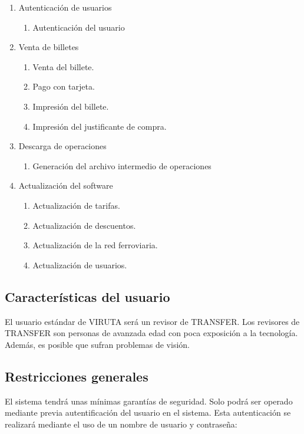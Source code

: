 \begin{enumerate}
\item Autenticación de usuarios
	\begin{enumerate}
	\item Autenticación del usuario
	\end{enumerate}
\item Venta de billetes
	\begin{enumerate}
	\item Venta del billete.
	\item Pago con tarjeta.
	\item Impresión del billete.
	\item Impresión del justificante de compra.
	\end{enumerate}
\item Descarga de operaciones
	\begin{enumerate}
	\item Generación del archivo intermedio de operaciones
	\end{enumerate}
\item Actualización del software
	\begin{enumerate}
	\item Actualización de tarifas.
	\item Actualización de descuentos.
	\item Actualización de la red ferroviaria.
	\item Actualización de usuarios.
	\end{enumerate}
\end{enumerate}

\subsection{Características del usuario}

El usuario estándar de VIRUTA será un revisor de TRANSFER. Los revisores de TRANSFER son personas de avanzada edad con poca exposición a la tecnología. Además, es posible que sufran problemas de visión.

\subsection{Restricciones generales}

El sistema tendrá unas mínimas garantías de seguridad. Solo podrá ser operado mediante previa autentificación del usuario en el sistema. Esta autenticación se realizará mediante el uso de un nombre de usuario y contraseña:\\

